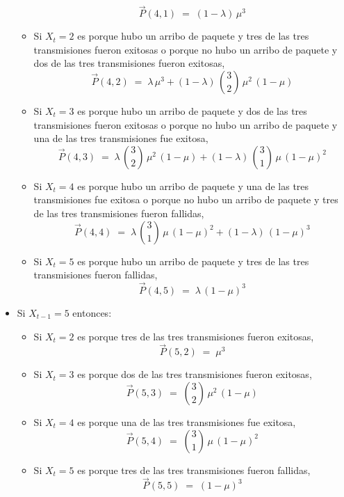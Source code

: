 \documentclass[ a4paper, twoside, 11pt]{article}
\begin{document}
\begin{problem}
\begin{itemize}
\begin{itemize}
\[
\vec{P}(4,1) \; = \; (1-\lambda) \, \mu^3
\]
\item Si $X_t = 2$ es porque hubo un arribo de paquete y tres de las tres transmisiones fueron exitosas o porque no hubo un arribo de paquete y dos de las tres transmisiones fueron exitosas, \iec
\[
\vec{P}(4,2) \; = \; \lambda \, \mu^3 + (1-\lambda) \, { 3 \choose 2 } \, \mu^2 \, (1-\mu)
\]
\item Si $X_t = 3$ es porque hubo un arribo de paquete y dos de las tres transmisiones fueron exitosas o porque no hubo un arribo de paquete y una de las tres transmisiones fue exitosa, \iec
\[
\vec{P}(4,3) \; = \; \lambda \, { 3 \choose 2 } \, \mu^2 \, (1-\mu) + (1-\lambda) \, { 3 \choose 1 } \, \mu \, (1-\mu)^2
\]
\item Si $X_t = 4$ es porque hubo un arribo de paquete y una de las tres transmisiones fue exitosa o porque no hubo un arribo de paquete y tres de las tres transmisiones fueron fallidas, \iec
\[
\vec{P}(4,4) \; = \; \lambda \, { 3 \choose 1 } \, \mu \, (1-\mu)^2 + (1-\lambda) \, (1-\mu)^3
\]
\item Si $X_t = 5$ es porque hubo un arribo de paquete y tres de las tres transmisiones fueron fallidas, \iec
\[
\vec{P}(4,5) \; = \; \lambda \, (1-\mu)^3
\]
\end{itemize}
\item Si $X_{t-1} = 5$ entonces: 
\begin{itemize}
\item Si $X_t = 2$ es porque tres de las tres transmisiones fueron exitosas, \iec
\[
\vec{P}(5,2) \; = \; \mu^3
\]
\item Si $X_t = 3$ es porque dos de las tres transmisiones fueron exitosas, \iec
\[
\vec{P}(5,3) \; = \; { 3 \choose 2 } \, \mu^2 \, (1-\mu)
\]
\item Si $X_t = 4$ es porque una de las tres transmisiones fue exitosa, \iec
\[
\vec{P}(5,4) \; = \; { 3 \choose 1 } \, \mu \, (1-\mu)^2
\]
\item Si $X_t = 5$ es porque tres de las tres transmisiones fueron fallidas, \iec
\[
\vec{P}(5,5) \; = \; (1-\mu)^3
\]
\end{itemize}
\end{itemize}


\end{problem}
\vspace{\baselineskip}
\end{document}
